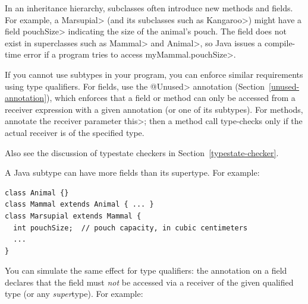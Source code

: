 
In an inheritance hierarchy, subclasses often introduce new methods and
fields.  For example, a \<Marsupial> (and its subclasses such as
\<Kangaroo>) might have a field \<pouchSize> indicating the size of the animal's
pouch.  The field does not exist in superclasses such as
\<Mammal> and \<Animal>, so Java issues a compile-time
error if a program tries to access \<myMammal.pouchSize>.

If you cannot use subtypes in your program, you can enforce similar
requirements using type qualifiers.
For fields, use the \<@Unused> annotation (Section~\ref{unused-annotation}), which enforces that a field or method can only
be accessed from a receiver expression with a given annotation (or one of
its subtypes).
For methods, annotate the receiver parameter \<this>; then a method call
type-checks only if the actual receiver is of the specified type.




Also see the discussion of typestate checkers in
Section~\ref{typestate-checker}.



A Java subtype can have more fields than its supertype.  For example:

\begin{Verbatim}
class Animal {}
class Mammal extends Animal { ... }
class Marsupial extends Mammal {
  int pouchSize;  // pouch capacity, in cubic centimeters
  ...
}
\end{Verbatim}

You can simulate
the same effect for type qualifiers:
the  annotation
on a field declares that the field must \emph{not} be accessed via a receiver of
the given qualified type (or any \emph{super}type).
For example:

